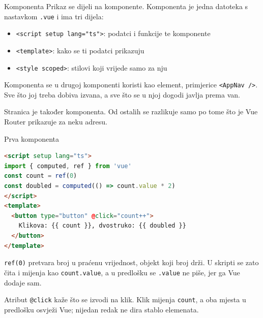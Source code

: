 \begin{frame}{Komponenta}
Prikaz se dijeli na komponente. Komponenta je jedna datoteka s nastavkom \texttt{.vue} i ima tri dijela:

\vspace{0.6em}
\begin{itemize}
  \itemsep0.5em
  \item \texttt{<script setup lang="ts">}: podatci i funkcije te komponente
  \item \texttt{<template>}: kako se ti podatci prikazuju
  \item \texttt{<style scoped>}: stilovi koji vrijede samo za nju
\end{itemize}

\vspace{0.8em}
Komponenta se u drugoj komponenti koristi kao element, primjerice \texttt{<AppNav />}. Sve što joj treba dobiva izvana, a sve što se u njoj dogodi javlja prema van.

\vspace{0.5em}
Stranica je također komponenta. Od ostalih se razlikuje samo po tome što je Vue Router prikazuje za neku adresu.
\end{frame}

\begin{frame}[fragile]{Prva komponenta}
\begin{lstlisting}[language=html]
<script setup lang="ts">
import { computed, ref } from 'vue'
const count = ref(0)
const doubled = computed(() => count.value * 2)
</script>
<template>
  <button type="button" @click="count++">
    Klikova: {{ count }}, dvostruko: {{ doubled }}
  </button>
</template>
\end{lstlisting}

\vspace{0.3em}
\texttt{ref(0)} pretvara broj u praćenu vrijednost, objekt koji broj drži. U skripti se zato čita i mijenja kao \texttt{count.value}, a u predlošku se \texttt{.value} ne piše, jer ga Vue dodaje sam.

\vspace{0.3em}
Atribut \texttt{@click} kaže što se izvodi na klik. Klik mijenja \texttt{count}, a oba mjesta u predlošku osvježi Vue; nijedan redak ne dira stablo elemenata.
\end{frame}

